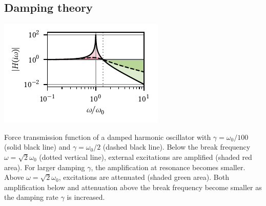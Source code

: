 \subsection{Damping theory}\label{subsec:setup:vibrations:isolation:theory}

\begin{marginfigure}
    \centering
    \includegraphics{img/pdf/setup/spring_tf}
    \caption[]{
        Force transmission function of a damped harmonic oscillator with $\gamma=\omega_0/100$ (solid black line) and $\gamma=\omega_0/2$ (dashed black line).
        Below the break frequency $\omega=\sqrt{2}\omega_0$ (dotted vertical line), external excitations are amplified (shaded red area).
        For larger damping $\gamma$, the amplification at resonance becomes smaller.
        Above $\omega=\sqrt{2}\omega_0$, excitations are attenuated (shaded green area).
        Both amplification below and attenuation above the break frequency become smaller as the damping rate $\gamma$ is increased.
    }
    \label{fig:setup:vibrations:spring:tf}
\end{marginfigure}

